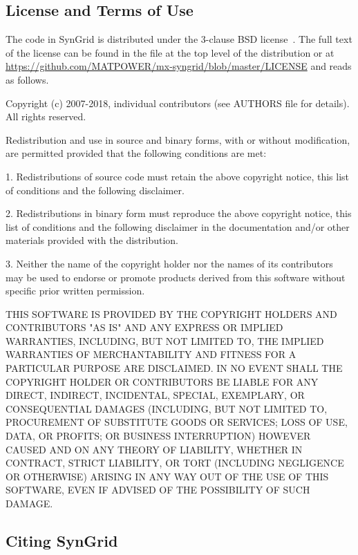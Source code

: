 \documentclass[12pt]{article}
\newcommand{\syngrid}[0]{{SynGrid}}
\newcommand{\code}[1]{{\relsize{-0.5}{\tt{{#1}}}}}  %
\numberwithin{equation}{section}
\numberwithin{table}{section}
\numberwithin{figure}{section}
\begin{document}
\clearpage
\subsection{License and Terms of Use}

The code in \syngrid{} is distributed under the 3-clause BSD license~\cite{bsd}. The full text of the license can be found in the \code{LICENSE} file at the top level of the distribution or at \url{https://github.com/MATPOWER/mx-syngrid/blob/master/LICENSE} and reads as follows.

\begin{Notice}
Copyright (c) 2007-2018, individual contributors (see AUTHORS file
for details). All rights reserved.

Redistribution and use in source and binary forms, with or without
modification, are permitted provided that the following conditions
are met:

1. Redistributions of source code must retain the above copyright
notice, this list of conditions and the following disclaimer.

2. Redistributions in binary form must reproduce the above copyright
notice, this list of conditions and the following disclaimer in the
documentation and/or other materials provided with the distribution.

3. Neither the name of the copyright holder nor the names of its
contributors may be used to endorse or promote products derived from
this software without specific prior written permission.

THIS SOFTWARE IS PROVIDED BY THE COPYRIGHT HOLDERS AND CONTRIBUTORS
"AS IS" AND ANY EXPRESS OR IMPLIED WARRANTIES, INCLUDING, BUT NOT
LIMITED TO, THE IMPLIED WARRANTIES OF MERCHANTABILITY AND FITNESS
FOR A PARTICULAR PURPOSE ARE DISCLAIMED. IN NO EVENT SHALL THE
COPYRIGHT HOLDER OR CONTRIBUTORS BE LIABLE FOR ANY DIRECT, INDIRECT,
INCIDENTAL, SPECIAL, EXEMPLARY, OR CONSEQUENTIAL DAMAGES (INCLUDING,
BUT NOT LIMITED TO, PROCUREMENT OF SUBSTITUTE GOODS OR SERVICES;
LOSS OF USE, DATA, OR PROFITS; OR BUSINESS INTERRUPTION) HOWEVER
CAUSED AND ON ANY THEORY OF LIABILITY, WHETHER IN CONTRACT, STRICT
LIABILITY, OR TORT (INCLUDING NEGLIGENCE OR OTHERWISE) ARISING IN
ANY WAY OUT OF THE USE OF THIS SOFTWARE, EVEN IF ADVISED OF THE
POSSIBILITY OF SUCH DAMAGE.
\end{Notice}

\clearpage
\subsection{Citing \syngrid{}}
\end{document}
